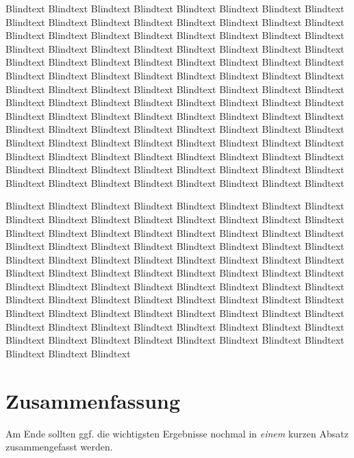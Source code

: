 Blindtext Blindtext Blindtext Blindtext Blindtext Blindtext Blindtext
Blindtext Blindtext Blindtext Blindtext Blindtext Blindtext Blindtext
Blindtext Blindtext Blindtext Blindtext Blindtext Blindtext Blindtext
Blindtext Blindtext Blindtext Blindtext Blindtext Blindtext Blindtext
Blindtext Blindtext Blindtext Blindtext Blindtext Blindtext Blindtext
Blindtext Blindtext Blindtext Blindtext Blindtext Blindtext Blindtext
Blindtext Blindtext Blindtext Blindtext Blindtext Blindtext Blindtext
Blindtext Blindtext Blindtext Blindtext Blindtext Blindtext Blindtext
Blindtext Blindtext Blindtext Blindtext Blindtext Blindtext Blindtext
Blindtext Blindtext Blindtext Blindtext Blindtext Blindtext Blindtext
Blindtext Blindtext Blindtext Blindtext Blindtext Blindtext Blindtext
Blindtext Blindtext Blindtext Blindtext Blindtext Blindtext Blindtext
Blindtext Blindtext Blindtext Blindtext Blindtext Blindtext Blindtext
Blindtext Blindtext Blindtext Blindtext Blindtext Blindtext Blindtext
Blindtext Blindtext Blindtext Blindtext Blindtext Blindtext Blindtext
Blindtext Blindtext Blindtext Blindtext Blindtext Blindtext Blindtext

Blindtext Blindtext Blindtext Blindtext Blindtext Blindtext Blindtext
Blindtext Blindtext Blindtext Blindtext Blindtext Blindtext Blindtext
Blindtext Blindtext Blindtext Blindtext Blindtext Blindtext Blindtext
Blindtext Blindtext Blindtext Blindtext Blindtext Blindtext Blindtext
Blindtext Blindtext Blindtext Blindtext Blindtext Blindtext Blindtext
Blindtext Blindtext Blindtext Blindtext Blindtext Blindtext Blindtext
Blindtext Blindtext Blindtext Blindtext Blindtext Blindtext Blindtext
Blindtext Blindtext Blindtext Blindtext Blindtext Blindtext Blindtext
Blindtext Blindtext Blindtext Blindtext Blindtext Blindtext Blindtext
Blindtext Blindtext Blindtext Blindtext Blindtext Blindtext Blindtext
Blindtext Blindtext Blindtext Blindtext Blindtext Blindtext Blindtext
Blindtext Blindtext Blindtext Blindtext Blindtext Blindtext Blindtext
Blindtext Blindtext Blindtext Blindtext Blindtext Blindtext Blindtext

\section{Zusammenfassung}
\label{ch:Entwurf:sec:zusammenfassung}

Am Ende sollten ggf. die wichtigsten Ergebnisse nochmal in \emph{einem}
kurzen Absatz zusammengefasst werden.

